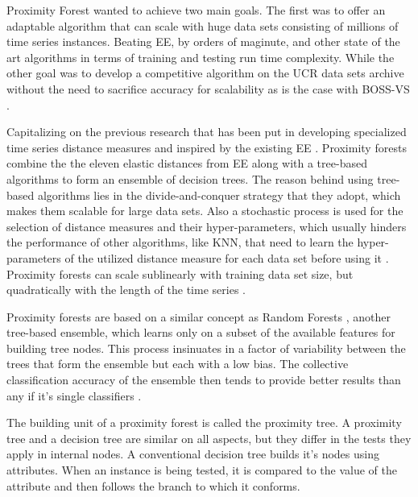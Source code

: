 Proximity Forest wanted to achieve two main goals. The first was to offer an adaptable algorithm that can scale with huge data sets consisting of millions of time series instances.
Beating EE, by orders of maginute, and other state of the art algorithms in terms of training and testing run time complexity.
While the other goal was to develop a competitive algorithm on the UCR data sets archive without the need to sacrifice accuracy for scalability as is the case with BOSS-VS \cite{lucas2019proximity}.


Capitalizing on the previous research that has been put in developing specialized time series distance measures and inspired by the existing EE \cite{fawaz2020inceptiontime,fawaz2019deep}.
Proximity forests combine the the eleven elastic distances from EE along with a tree-based algorithms to form an ensemble of decision trees.
The reason behind using tree-based algorithms lies in the divide-and-conquer strategy that they adopt, which makes them scalable for large data sets.
Also a stochastic process is used for the selection of distance measures and their hyper-parameters, which usually hinders the performance of other algorithms,
like KNN, that need to learn the hyper-parameters of the utilized distance measure for each data set before using it \cite{lucas2019proximity}.
Proximity forests can scale sublinearly with training data set size, but quadratically with the length of the time series \cite{shifaz2020ts}.

Proximity forests are based on a similar concept as Random Forests \cite{breiman2001random}, another tree-based ensemble, which learns only on a subset of the available features
for building tree nodes. This process insinuates in a factor of variability between the trees that form the ensemble but each with a low bias.
The collective classification accuracy of the ensemble then tends to provide better results than any if it's single classifiers \cite{lucas2019proximity}.

The building unit of a proximity forest is called the proximity tree. A proximity tree and a decision tree are similar on all aspects,
but they differ in the tests they apply in internal nodes.
A conventional decision tree builds it's nodes using attributes. When an instance is being tested, it is compared to the value of the attribute
and then follows the branch to which it conforms.

